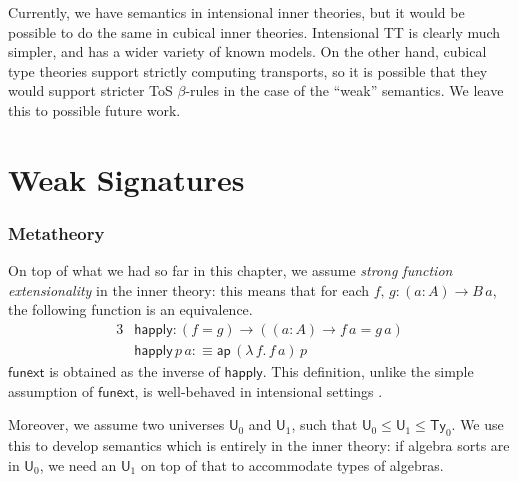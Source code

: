 \documentclass[12pt,a4paper,twoside,openany]{book}
\theoremstyle{remark}
\theoremstyle{definition}
\theoremstyle{theorem}
\newcommand{\ms}[1]{\mathsf{#1}}
\newcommand{\ap}{\ms{ap}}
\newcommand{\Ty}{\mathsf{Ty}}
\newcommand{\U}{\mathsf{U}}
\newcommand{\defn}{:\equiv}
\begin{document}
Currently, we have semantics in intensional inner theories, but it would be
possible to do the same in cubical inner theories. Intensional TT is clearly
much simpler, and has a wider variety of known models. On the other hand,
cubical type theories support strictly computing transports, so it is possible
that they would support stricter ToS $\beta$-rules in the case of the ``weak''
semantics. We leave this to possible future work.

\section{Weak Signatures}

\subsubsection{Metatheory}

On top of what we had so far in this chapter, we assume \emph{strong function
extensionality} in the inner theory: this means that for each $f,\,g : (a : A)
\to B\,a$, the following function is an equivalence.
\begin{alignat*}{3}
  &\ms{happly} : (f = g) \to ((a : A) \to f\,a = g\,a)\\
  &\ms{happly}\,p\,a \defn \ap\,(\lambda\,f.\,f\,a)\,p
\end{alignat*}
$\ms{funext}$ is obtained as the inverse of $\ms{happly}$. This definition,
unlike the simple assumption of $\ms{funext}$, is well-behaved in intensional
settings \cite[Section~2.9]{hottbook}.

Moreover, we assume two universes $\U_0$ and $\U_1$, such that $\U_0 \leq \U_1
\leq \Ty_0$. We use this to develop semantics which is entirely in the inner
theory: if algebra sorts are in $\U_0$, we need an $\U_1$ on top of that to
accommodate types of algebras.

\end{document}
